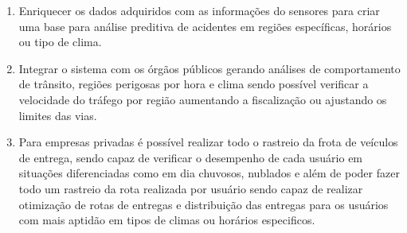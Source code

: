 \begin{enumerate}
    \item Enriquecer os dados adquiridos com as informações do sensores para criar uma base para análise preditiva de acidentes em regiões específicas, horários ou tipo de clima.
    
    \item Integrar o sistema com os órgãos  públicos gerando análises de comportamento de trânsito, regiões perigosas por hora e clima sendo possível verificar a velocidade do tráfego por região aumentando a fiscalização ou ajustando os limites das vias.
    
    \item Para empresas privadas é possível realizar todo o rastreio da frota de veículos de entrega, sendo capaz de verificar o desempenho de cada usuário em situações diferenciadas como em dia chuvosos, nublados e além de poder fazer todo um rastreio da rota realizada por usuário sendo capaz de realizar otimização de rotas de entregas e distribuição das entregas para os usuários com mais aptidão em tipos de climas ou horários especificos.
    
\end{enumerate}









